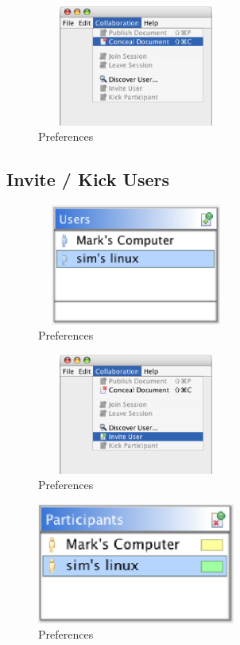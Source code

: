 \documentclass[11pt,a4paper]{article}
\begin{document}
\begin{figure}[H]
\begin{center}
  \includegraphics[height=1.56in, width=2.56in]{../images/usermanual/nmenu_collaboration_conceal.bmp.eps}
\caption{Preferences}
\label{default}
\end{center}
\end{figure}

\subsection{Invite / Kick Users}
\begin{figure}[H]
\begin{center}
  \includegraphics[height=1.56in, width=2.56in]{../images/usermanual/uview_invite.bmp.eps}
\caption{Preferences}
\label{default}
\end{center}
\end{figure}
\begin{figure}[H]
\begin{center}
  \includegraphics[height=1.56in, width=2.56in]{../images/usermanual/nmenu_collaboration_invite.bmp.eps}
\caption{Preferences}
\label{default}
\end{center}
\end{figure}
\begin{figure}[H]
\begin{center}
  \includegraphics[height=1.56in, width=2.56in]{../images/usermanual/pview_kick.bmp.eps}
\caption{Preferences}
\label{default}
\end{center}
\end{figure}
\end{document}
